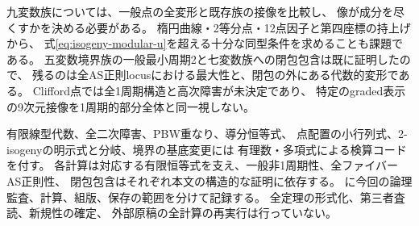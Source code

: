 \documentclass[11pt,a4paper]{ltjsarticle}
\theoremstyle{definition}
\begin{document}
九変数族については、一般点の全変形と既存族の接像を比較し、
像が成分を尽くすかを決める必要がある。
楕円曲線・2等分点・12点因子と第四座標の持上げから、
式\eqref{eq:isogeny-modular-u}を超える十分な同型条件を求めることも課題である。
五変数境界族の一般最小周期2と七変数族への閉包包含は既に証明したので、
残るのは全AS正則locusにおける最大性と、閉包の外にある代数的変形である。
Clifford点では全1周期構造と高次障害が未決定であり、
特定のgraded表示の9次元接像を1周期的部分全体と同一視しない。

有限線型代数、全二次障害、PBW重なり、導分恒等式、
点配置の小行列式、2-isogenyの明示式と分岐、境界の基底変更には
有理数・多項式による検算コードを付す。
各計算は対応する有限恒等式を支え、一般非1周期性、全ファイバーAS正則性、
閉包包含はそれぞれ本文の構造的な証明に依存する。
に今回の論理監査、計算、組版、保存の範囲を分けて記録する。
全定理の形式化、第三者査読、新規性の確定、
外部原稿\cite{as4period}の全計算の再実行は行っていない。
\end{document}
